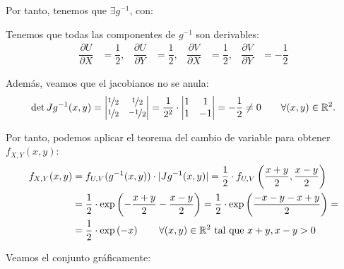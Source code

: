 \begin{ejercicio}
    Por tanto, tenemos que $\exists g^{-1}$, con:

    Tenemos que todas las componentes de $g^{-1}$ son derivables:
    \begin{align*}
        \dfrac{\partial U}{\partial X} &= \dfrac{1}{2}, & \dfrac{\partial U}{\partial Y} &= \dfrac{1}{2}, & \dfrac{\partial V}{\partial X} &= \dfrac{1}{2}, & \dfrac{\partial V}{\partial Y} &= -\dfrac{1}{2}
    \end{align*}

    Además, veamos que el jacobianos no se anula:
    \begin{equation*}
        \det Jg^{-1}(x,y)=\begin{vmatrix}
            \nicefrac{1}{2} & \nicefrac{1}{2}\\
            \nicefrac{1}{2} & \nicefrac{-1}{2}
        \end{vmatrix}=
        \dfrac{1}{2^2}\cdot \begin{vmatrix}
            1 & 1\\
            1 & -1
        \end{vmatrix}=
        -\frac{1}{2}\neq 0 \qquad \forall (x,y)\in\mathbb{R}^2.
    \end{equation*}

    Por tanto, podemos aplicar el teorema del cambio de variable para obtener $f_{X,Y}(x,y)$:
    \begin{align*}
        f_{X,Y}(x,y) &= f_{U,V}(g^{-1}(x,y))\cdot |Jg^{-1}(x,y)|
        = \dfrac{1}{2}\cdot f_{U,V}\left(\frac{x+y}{2},\frac{x-y}{2}\right)\\
        &= \dfrac{1}{2}\cdot \exp\left(-\frac{x+y}{2}-\frac{x-y}{2}\right)
        = \dfrac{1}{2}\cdot \exp\left(\dfrac{-x-y-x+y}{2}\right)
        =\\&= \dfrac{1}{2}\cdot \exp\left(-x\right)
        \qquad \forall (x,y)\in \mathbb{R}^2 \text{ tal que } x+y, x-y>0
    \end{align*}

    Veamos el conjunto gráficamente:
    \begin{figure}[H]
        \centering
\end{figure}
\end{ejercicio}
